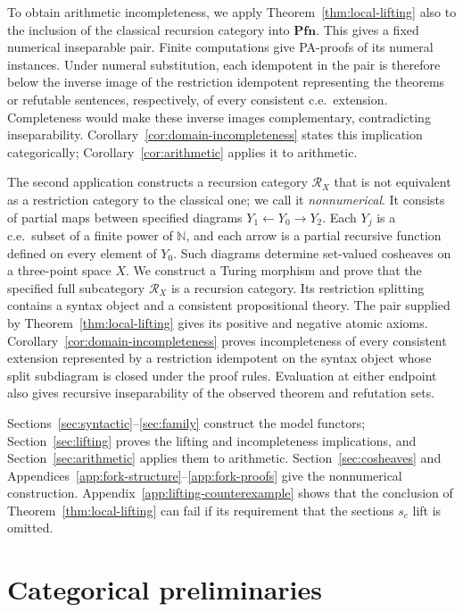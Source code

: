 \documentclass[11pt]{article}
\newcommand{\N}{\mathbb N}
\newcommand{\Pfn}{\mathbf{Pfn}}
\begin{document}
To obtain arithmetic incompleteness, we apply
Theorem~\ref{thm:local-lifting} also to the inclusion of the classical
recursion category into $\Pfn$. This gives a fixed numerical
inseparable pair. Finite computations give PA-proofs of its numeral
instances. Under numeral substitution, each idempotent in the pair is
therefore below the inverse image of the restriction idempotent
representing the theorems or refutable sentences, respectively, of
every consistent c.e.\ extension. Completeness would make these inverse
images complementary, contradicting inseparability.
Corollary~\ref{cor:domain-incompleteness} states this implication
categorically; Corollary~\ref{cor:arithmetic} applies it to arithmetic.

The second application constructs a recursion category $\mathscr R_X$
that is not equivalent as a restriction category to the classical
one; we call it \emph{nonnumerical}. It consists of partial maps
between specified diagrams $Y_1\leftarrow Y_0\to Y_2$.
Each $Y_j$ is a c.e.\ subset of a finite power of $\N$, and each arrow
is a partial recursive function defined on every element of $Y_0$.
Such diagrams determine set-valued cosheaves on a three-point space $X$.
We construct a Turing morphism and prove that the specified full
subcategory $\mathscr R_X$ is a recursion category. Its restriction
splitting contains a syntax object and a consistent propositional
theory. The pair supplied by Theorem~\ref{thm:local-lifting} gives
its positive and negative atomic axioms.
Corollary~\ref{cor:domain-incompleteness} proves incompleteness of every
consistent extension represented by a restriction idempotent on the
syntax object whose split subdiagram is closed under the proof rules.
Evaluation at either endpoint also gives recursive inseparability of the observed theorem and
refutation sets.

Sections~\ref{sec:syntactic}--\ref{sec:family} construct the model
functors; Section~\ref{sec:lifting} proves the lifting and
incompleteness implications, and Section~\ref{sec:arithmetic}
applies them to arithmetic. Section~\ref{sec:cosheaves} and
Appendices~\ref{app:fork-structure}--\ref{app:fork-proofs} give the
nonnumerical construction. Appendix~\ref{app:lifting-counterexample}
shows that the conclusion of Theorem~\ref{thm:local-lifting} can fail
if its requirement that the sections $s_c$ lift is omitted.

\section{Categorical preliminaries}\label{sec:preliminaries}
\end{document}
